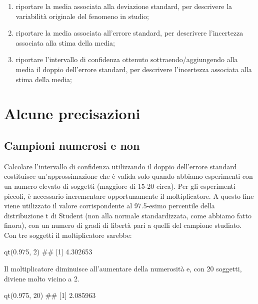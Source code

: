 \documentclass[a4paper,12pt,oneside]{book}
\providecommand{\tightlist}{%
  \setlength{\itemsep}{0pt}\setlength{\parskip}{0pt}}
\newenvironment{Shaded}{\begin{snugshade}}{\end{snugshade}}
\newcommand{\DecValTok}[1]{#1}
\newcommand{\FloatTok}[1]{#1}
\newcommand{\DocumentationTok}[1]{#1}
\newcommand{\FunctionTok}[1]{#1}
\newcommand{\NormalTok}[1]{#1}
\begin{document}
\begin{enumerate}
\def\labelenumi{\arabic{enumi}.}
\tightlist
\item
  riportare la media associata alla deviazione standard, per descrivere la variabilità originale del fenomeno in studio;
\item
  riportare la media associata all'errore standard, per descrivere l'incertezza associata alla stima della media;
\item
  riportare l'intervallo di confidenza ottenuto sottraendo/aggiungendo alla media il doppio dell'errore standard, per descrivere l'incertezza associata alla stima della media;
\end{enumerate}

\hypertarget{alcune-precisazioni}{%
\section{Alcune precisazioni}\label{alcune-precisazioni}}

\hypertarget{campioni-numerosi-e-non}{%
\subsection{Campioni numerosi e non}\label{campioni-numerosi-e-non}}

Calcolare l'intervallo di confidenza utilizzando il doppio dell'errore standard costituisce un'approssimazione che è valida solo quando abbiamo esperimenti con un numero elevato di soggetti (maggiore di 15-20 circa). Per gli esperimenti piccoli, è necessario incrementare opportunamente il moltiplicatore. A questo fine viene utilizzato il valore corrispondente al 97.5-esimo percentile della distribuzione t di Student (non alla normale standardizzata, come abbiamo fatto finora), con un numero di gradi di libertà pari a quelli del campione studiato. Con tre soggetti il moltiplicatore sarebbe:

\begin{Shaded}
\begin{Highlighting}[]
\FunctionTok{qt}\NormalTok{(}\FloatTok{0.975}\NormalTok{, }\DecValTok{2}\NormalTok{)}
\DocumentationTok{\#\# [1] 4.302653}
\end{Highlighting}
\end{Shaded}

Il moltiplicatore diminuisce all'aumentare della numerosità e, con 20 soggetti, diviene molto vicino a 2.

\begin{Shaded}
\begin{Highlighting}[]
\FunctionTok{qt}\NormalTok{(}\FloatTok{0.975}\NormalTok{, }\DecValTok{20}\NormalTok{)}
\DocumentationTok{\#\# [1] 2.085963}
\end{Highlighting}
\end{Shaded}
\end{document}
